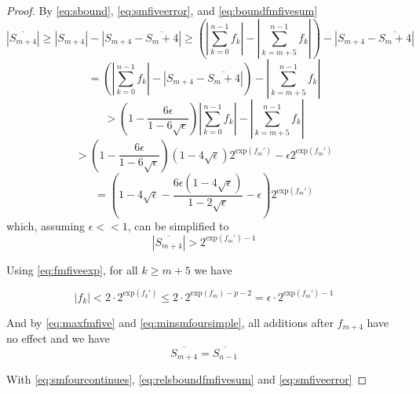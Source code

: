 \documentclass[12pt]{article}
\providecommand{\exp}{\ensuremath{\text{exp}}}
\theoremstyle{definition}
\numberwithin{equation}{section}
\numberwithin{figure}{section}
\begin{document}
\begin{proof}
      By  \eqref{eq:sbound}, \eqref{eq:smfiveerror}, and \eqref{eq:boundfmfivesum}
        \begin{equation*}
          |\overline{S_{m + 4}}| \geq |S_{m + 4}| - |S_{m + 4} - \overline{S_m + 4}| \geq (|\sum\limits_{k = 0}^{n - 1} f_k| - |\sum\limits_{k = m + 5}^{n - 1}f_k|) - |S_{m + 4} - \overline{S_m + 4}|
        \end{equation*}
        \begin{equation*}
           = (|\sum\limits_{k = 0}^{n - 1} f_k| - |S_{m + 4} - \overline{S_m + 4}|) - |\sum\limits_{k = m + 5}^{n - 1}f_k|
        \end{equation*}
        \begin{equation*}
           > (1 - \frac{6\epsilon}{1 - 6\sqrt\epsilon})|\sum\limits_{k = 0}^{n - 1} f_k| - |\sum\limits_{k = m + 5}^{n - 1}f_k|
        \end{equation*}
        \begin{equation*}
           > (1 - \frac{6\epsilon}{1 - 6\sqrt\epsilon})(1 - 4 \sqrt\epsilon)2^{\exp(f_m')} - \epsilon2^{\exp(f_m')}
        \end{equation*}
        \begin{equation}
          = (1 - 4\sqrt\epsilon - \frac{6\epsilon(1 - 4\sqrt\epsilon)}{1 - 2\sqrt\epsilon} - \epsilon) 2^{\exp(f_m')}
        \end{equation}
        which, assuming $\epsilon << 1$, can be simplified to
        \begin{equation}
          |\overline{S_{m + 4}}| > 2^{\exp(f_m') - 1}
          \label{eq:minsmfoursimple}
        \end{equation}

        Using  \eqref{eq:fmfiveexp}, for all $k \geq m + 5$ we have

        \begin{equation}
          |f_k| < 2 \cdot 2^{\exp(f_k')} \leq 2 \cdot 2^{\exp(f_m) - p - 2} = \epsilon \cdot 2^{\exp(f_m') - 1}
          \label{eq:maxfmfive}
        \end{equation}

        And by  \eqref{eq:maxfmfive} and \eqref{eq:minsmfoursimple}, all additions after $f_{m + 4}$ have no effect and we have
        \begin{equation}
          \overline{S_{m + 4}} = \overline{S_{n - 1}}
          \label{eq:smfourcontinues}
        \end{equation}

        With  \eqref{eq:smfourcontinues}, \eqref{eq:relsboundfmfivesum} and \eqref{eq:smfiveerror}


\end{proof}
\end{document}
